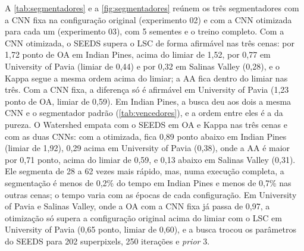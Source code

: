 A \autoref{tab:segmentadores} e a \autoref{fig:segmentadores} reúnem os três segmentadores com a CNN fixa na configuração original (experimento 02) e com a CNN otimizada para cada um (experimento 03), com 5 sementes e o treino completo. Com a CNN otimizada, o SEEDS supera o LSC de forma afirmável nas três cenas: por 1,72 ponto de OA em Indian Pines, acima do limiar de 1,52, por 0,77 em University of Pavia (limiar de 0,44) e por 0,32 em Salinas Valley (0,28), e o Kappa segue a mesma ordem acima do limiar; a AA fica dentro do limiar nas três. Com a CNN fixa, a diferença só é afirmável em University of Pavia (1,23 ponto de OA, limiar de 0,59). Em Indian Pines, a busca deu aos dois a mesma CNN e o segmentador padrão (\autoref{tab:vencedores}), e a ordem entre eles é a da pureza. O Watershed empata com o SEEDS em OA e Kappa nas três cenas e com as duas CNNs: com a otimizada, fica 0,89 ponto abaixo em Indian Pines (limiar de 1,92), 0,29 acima em University of Pavia (0,38), onde a AA é maior por 0,71 ponto, acima do limiar de 0,59, e 0,13 abaixo em Salinas Valley (0,31). Ele segmenta de 28 a 62 vezes mais rápido, mas, numa execução completa, a segmentação é menos de 0,2\% do tempo em Indian Pines e menos de 0,7\% nas outras cenas; o tempo varia com as épocas de cada configuração. Em University of Pavia e Salinas Valley, onde a OA com a CNN fixa já passa de 0,97, a otimização só supera a configuração original acima do limiar com o LSC em University of Pavia (0,65 ponto, limiar de 0,60), e a busca trocou os parâmetros do SEEDS para 202 superpixels, 250 iterações e \textit{prior} 3.

